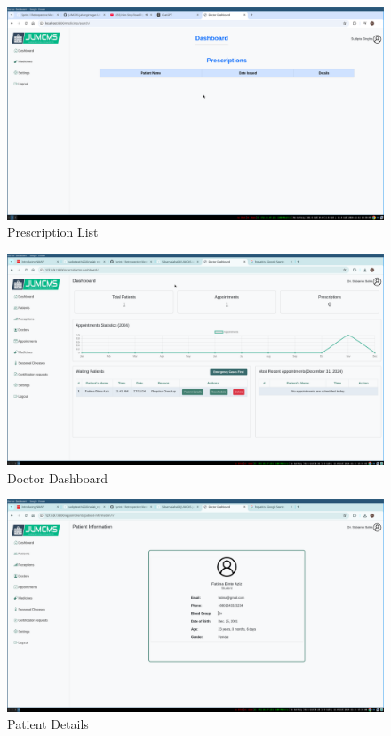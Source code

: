 \documentclass[a4paper,12pt]{article}
\begin{document}
\begin{figure}[H]
    \centering
    \includegraphics[width=1\textwidth]{images/spr1output4.png}
    \caption{Prescription List}
    \label{fig:prescriptionlist}
\end{figure}
\begin{figure}[H]
    \centering
    \includegraphics[width=1\textwidth]{images/sprintoutput01.png}
    \caption{Doctor Dashboard}
    \label{fig:doctordashboard}
\end{figure}

\begin{figure}[H]
    \centering
    \includegraphics[width=1\textwidth]{images/sprintoutput02.png}
    \caption{Patient Details}
    \label{fig:patientdetails}
\end{figure}
\end{document}
